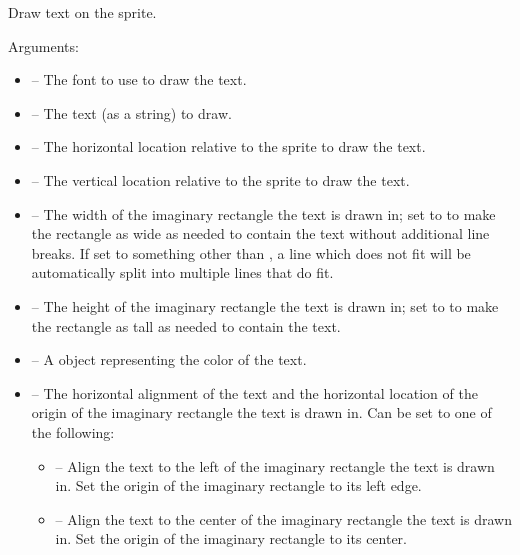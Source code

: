 \documentclass[letterpaper,10pt,english]{sphinxmanual}
\begin{document}
\begin{fulllineitems}
\label{gfx:sge.gfx.Sprite.draw_text}
Draw text on the sprite.

Arguments:
\begin{itemize}
\item {} 
 -- The font to use to draw the text.

\item {} 
 -- The text (as a string) to draw.

\item {} 
 -- The horizontal location relative to the sprite to
draw the text.

\item {} 
 -- The vertical location relative to the sprite to draw
the text.

\item {} 
 -- The width of the imaginary rectangle the text is
drawn in; set to  to make the rectangle as wide
as needed to contain the text without additional line breaks.
If set to something other than , a line which
does not fit will be automatically split into multiple lines
that do fit.

\item {} 
 -- The height of the imaginary rectangle the text
is drawn in; set to  to make the rectangle as
tall as needed to contain the text.

\item {} 
 -- A {\hyperref[gfx:sge.gfx.Color]{\emph{}}} object representing the
color of the text.

\item {} 
 -- The horizontal alignment of the text and the
horizontal location of the origin of the imaginary rectangle
the text is drawn in.  Can be set to one of the following:
\begin{itemize}
\item {} 
 -- Align the text to the left of the imaginary
rectangle the text is drawn in.  Set the origin of the
imaginary rectangle to its left edge.

\item {} 
 -- Align the text to the center of the
imaginary rectangle the text is drawn in.  Set the origin of
the imaginary rectangle to its center.


\end{itemize}
\end{itemize}
\end{fulllineitems}
\end{document}
